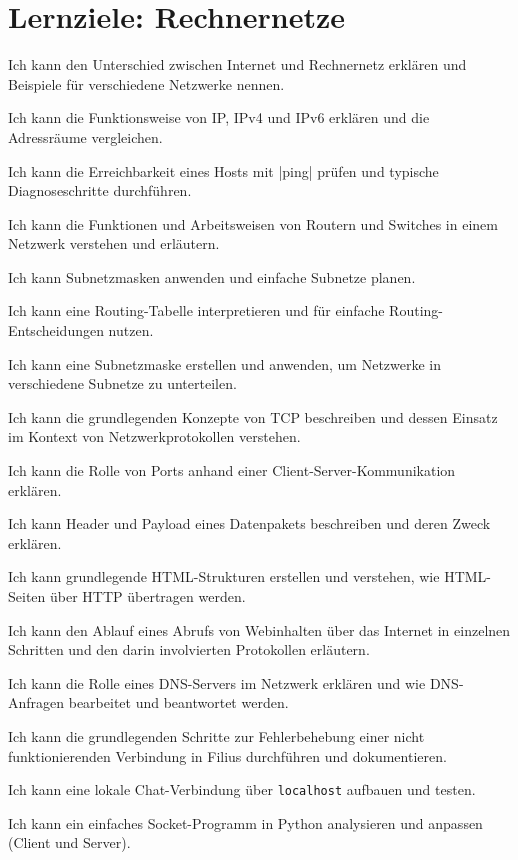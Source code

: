 \chapter{Lernziele: Rechnernetze}
\begin{todolist}
\item Ich kann den Unterschied zwischen Internet und Rechnernetz erklären und Beispiele für verschiedene Netzwerke nennen.
\item Ich kann die Funktionsweise von \gls{IP}, \gls{IP}v4 und \gls{IP}v6 erklären und die Adressräume vergleichen.
\item Ich kann die Erreichbarkeit eines Hosts mit \commandbox*|ping| prüfen und typische Diagnoseschritte durchführen.
\item Ich kann die Funktionen und Arbeitsweisen von Routern und Switches in einem Netzwerk verstehen und erläutern.
\item Ich kann Subnetzmasken anwenden und einfache Subnetze planen.
\item Ich kann eine Routing-Tabelle interpretieren und für einfache Routing-Entscheidungen nutzen.
\item Ich kann eine Subnetzmaske erstellen und anwenden, um Netzwerke in verschiedene Subnetze zu unterteilen.
\item Ich kann die grundlegenden Konzepte von \gls{TCP} beschreiben und dessen Einsatz im Kontext von Netzwerkprotokollen verstehen.
\item Ich kann die Rolle von Ports anhand einer Client-Server-Kommunikation erklären.
\item Ich kann Header und Payload eines Datenpakets beschreiben und deren Zweck erklären.
\item Ich kann grundlegende \gls{HTML}-Strukturen erstellen und verstehen, wie \gls{HTML}-Seiten über \gls{HTTP} übertragen werden.
\item Ich kann den Ablauf eines Abrufs von Webinhalten über das Internet in einzelnen Schritten und den darin involvierten Protokollen erläutern.
\item Ich kann die Rolle eines \gls{DNS}-Servers im Netzwerk erklären und wie \gls{DNS}-Anfragen bearbeitet und beantwortet werden.
\item Ich kann die grundlegenden Schritte zur Fehlerbehebung einer nicht funktionierenden Verbindung in Filius durchführen und dokumentieren.
\item Ich kann eine lokale Chat-Verbindung über \texttt{localhost} aufbauen und testen.
\item Ich kann ein einfaches Socket-Programm in Python analysieren und anpassen (Client und Server).

\end{todolist}
